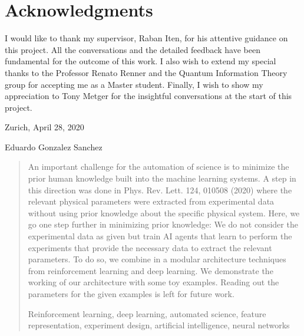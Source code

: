 \documentclass[11pt,a4paper,twoside]{report}
\newcommand{\+}{\textnormal{+} }
\theoremstyle{definition}
\numberwithin{equation}{chapter}
\begin{document}
%
%
%
\chapter*{Acknowledgments}
I would like to thank my supervisor, Raban Iten, for his attentive guidance on
this project. All the conversations and the detailed feedback have been
fundamental for the outcome of this work. I also wish to extend my special
thanks to the Professor Renato Renner and the Quantum Information Theory group
for accepting me as a Master student. Finally, I wish to show my appreciation to
Tony Metger for the insightful conversations at the start of this project.

\vspace{1.1cm}
\noindent
Zurich,  April 28, 2020

\vspace{2.4cm}
\noindent
Eduardo Gonzalez Sanchez
\thispagestyle{plain}
\clearpage

\thispagestyle{plain}
\cleardoublepage
%
%
%
\huge
\begin{abstract}
  \setcounter{page}{5}
\thispagestyle{plain}
  \normalsize
  \vspace{0.5cm}


\noindent An important challenge for the automation of science is to minimize
the prior human knowledge built into the machine learning systems. A step in
this direction was done in Phys. Rev. Lett. 124, 010508 (2020) where the
relevant physical parameters were extracted from experimental data without using
prior knowledge about the specific physical system. Here, we go one step further
in minimizing prior knowledge: We do not consider the experimental data as given
but train AI agents that learn to perform the experiments that provide the
necessary data to extract the relevant parameters. To do so, we combine in a
modular architecture techniques from reinforcement learning and deep learning.
We demonstrate the working of our architecture with some toy examples. Reading
out the parameters for the given examples is left for future work.
\vspace{3mm}

\noindent 

\vspace{10mm}
Reinforcement learning, deep learning, automated science, feature representation, 
experiment design, artificial intelligence, neural networks
\end{abstract}
\end{document}
